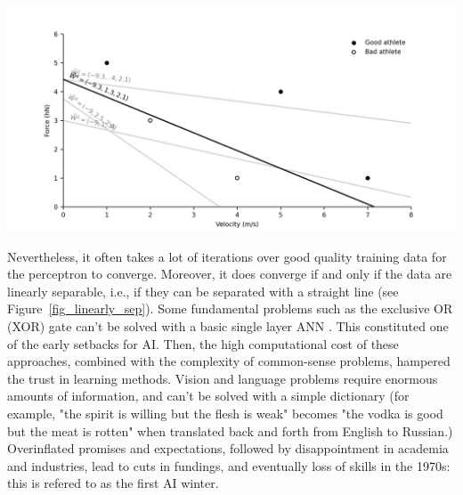 \begin{tcolorbox}[colback=white,colframe=black, colbacktitle=white, coltitle=black, breakable, title=\textbf{Example 1} Athlete classification with a perceptron, label=example1]
      {
      \begin{center}
      \def\svgwidth{1\columnwidth}
      \fontsize{10pt}{10pt}\selectfont
      \includegraphics[width=\linewidth]{"../Chap2/Figures/Fig_perceptron.png"}
      \end{center}
      \label{fig_perceptron}
      }
\end{tcolorbox}

Nevertheless, it often takes a lot of iterations over good quality training data for the perceptron to converge. Moreover, it does converge if and only if the data are linearly separable, i.e., if they can be separated with a straight line \cite{Novikoff1963} (see Figure~\ref{fig_linearly_sep}). Some fundamental problems such as the exclusive OR (XOR) gate can't be solved with a basic single layer ANN \cite{Minsky1969}. This constituted one of the early setbacks for AI. Then, the high computational cost of these approaches, combined with the complexity of common-sense problems, hampered the trust in learning methods. Vision and language problems require enormous amounts of information, and can't be solved with a simple dictionary (for example, "the spirit is willing but the flesh is weak" becomes "the vodka is good but the meat is rotten" when translated back and forth from English to Russian.) Overinflated promises and expectations, followed by disappointment in academia and industries, lead to cuts in fundings, and eventually loss of skills in the 1970s: this is refered to as the first AI winter.


